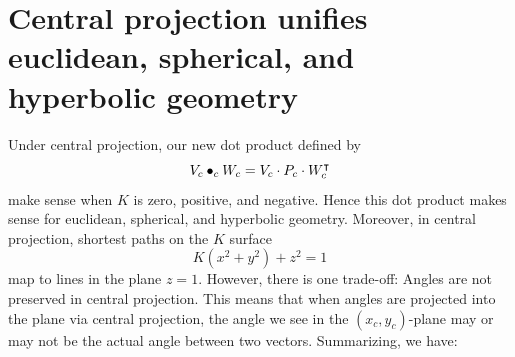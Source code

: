 \documentclass{ximera}
\begin{document}
\section{Central projection unifies euclidean, spherical, and hyperbolic geometry}

Under central projection, our new dot product defined by
\[
V_c\bullet_c W_c = V_c\cdot P_c\cdot W_c^\intercal
\]
make sense when $K$ is zero, positive, and negative. Hence this dot
product makes sense for euclidean, spherical, and hyperbolic
geometry. Moreover, in central projection, shortest paths on the $K$ surface
\[
K\left(x^2 + y^2\right) + z^2 = 1
\]
map to lines in the plane $z=1$. However, there is one trade-off:
Angles are not preserved in central projection. This means that when
angles are projected into the plane via central projection, the angle
we see in the $(x_c,y_c)$-plane may or may not be the actual angle
between two vectors. Summarizing, we have:
\end{document}
